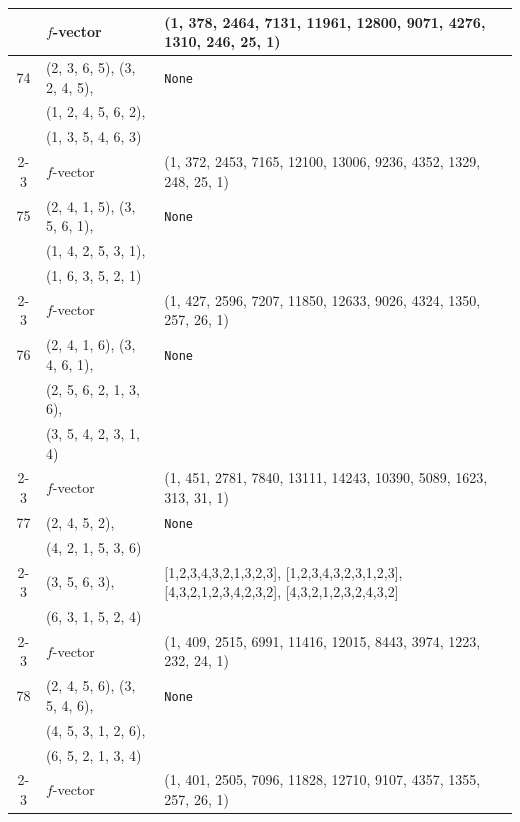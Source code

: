 \documentclass[10pt]{amsart}
\numberwithin{equation}{section}
\theoremstyle{plain}
\theoremstyle{definition}
\theoremstyle{remark}
\begin{document}
{\begin{longtable}{c|l|l}
		& $f$-vector & {(1, 378, 2464, 7131, 11961, 12800, 9071, 4276, 1310, 246, 25, 1)} \\
		\midrule
		
		74 & (2, 3, 6, 5), (3, 2, 4, 5), & \texttt{None} \\
		& (1, 2, 4, 5, 6, 2), &  \\
		& (1, 3, 5, 4, 6, 3) &  \\ \cline{2-3}
		
		& $f$-vector & {(1, 372, 2453, 7165, 12100, 13006, 9236, 4352, 1329, 248, 25, 1)} \\
		\midrule
		
		75 & (2, 4, 1, 5), (3, 5, 6, 1), & \texttt{None} \\
		& (1, 4, 2, 5, 3, 1), &  \\
		& (1, 6, 3, 5, 2, 1) &  \\ \cline{2-3}
		
		& $f$-vector & {(1, 427, 2596, 7207, 11850, 12633, 9026, 4324, 1350, 257, 26, 1)} \\
		\midrule
		
		76 & (2, 4, 1, 6), (3, 4, 6, 1), & \texttt{None} \\
		& (2, 5, 6, 2, 1, 3, 6), &  \\
		& (3, 5, 4, 2, 3, 1, 4) &  \\ \cline{2-3}
		
		& $f$-vector & {(1, 451, 2781, 7840, 13111, 14243, 10390, 5089, 1623, 313, 31, 1)} \\
		\midrule
		
		77 & (2, 4, 5, 2), & \texttt{None} \\
		& (4, 2, 1, 5, 3, 6) &  \\ \cline{2-3}
		
		& (3, 5, 6, 3), & [1,2,3,4,3,2,1,3,2,3], [1,2,3,4,3,2,3,1,2,3], [4,3,2,1,2,3,4,2,3,2], [4,3,2,1,2,3,2,4,3,2] \\
		& (6, 3, 1, 5, 2, 4) &  \\ \cline{2-3}
		
		& $f$-vector & {(1, 409, 2515, 6991, 11416, 12015, 8443, 3974, 1223, 232, 24, 1)} \\
		\midrule
		
		78 & (2, 4, 5, 6), (3, 5, 4, 6), & \texttt{None} \\
		& (4, 5, 3, 1, 2, 6), &  \\
		& (6, 5, 2, 1, 3, 4) &  \\ \cline{2-3}
		
		& $f$-vector & {(1, 401, 2505, 7096, 11828, 12710, 9107, 4357, 1355, 257, 26, 1)} \\
		\midrule
		

\end{longtable}}
\end{document}
